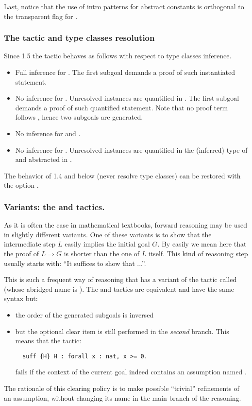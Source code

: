Last, notice that the use of intro patterns for abstract constants is
orthogonal to the transparent flag  for .

\subsubsection*{The  tactic and type classes resolution}
\label{ssec:havetcresolution}

Since \ssr{} 1.5 the  tactic behaves as follows with respect to type
classes inference.

\begin{itemize}
\item {}
	Full inference for .
	The first subgoal demands a proof of such instantiated statement.
\item {}
	No inference for . Unresolved instances are quantified in
	.  The first subgoal demands a proof of such quantified
	statement.  Note that no proof term follows \C{:=}, hence two
	subgoals are generated.
\item {}
	No inference for  and .
\item {}
	No inference for . Unresolved instances are quantified in the
	(inferred) type of  and abstracted in .
\end{itemize}

The behavior of \ssr{} 1.4 and below (never resolve type classes)
can be restored with the option .

\subsubsection*{Variants: the  and   tactics.}

As it is often the case  in mathematical textbooks, forward
reasoning may be used in slightly different variants.
One of these variants is to show that the intermediate step $L$
easily implies the initial goal $G$. By easily we mean here that
the proof of $L \Rightarrow G$ is shorter than the one of $L$
itself. This kind of reasoning step usually starts with: 
``It suffices to show that ...''.

This is such a frequent way of reasoning that \ssr{} has a variant of the
 tactic called  (whose abridged name is
). The  and  tactics are equivalent and
have the same syntax but:
\begin{itemize}
\item the order of the generated subgoals is inversed
\item but the optional clear item is still performed in the
  \emph{second} branch. This means that the tactic:
\begin{lstlisting}
  suff {H} H : forall x : nat, x >= 0.
\end{lstlisting}
fails if the context of the current goal indeed contains an
assumption named .
\end{itemize}
The rationale of this clearing policy is to make possible ``trivial''
refinements of an assumption, without changing its name in the main
branch of the reasoning.

